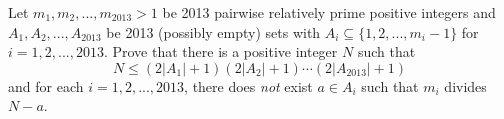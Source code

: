 Let $m_1,m_2,...,m_{2013} > 1$ be 2013 pairwise relatively prime positive integers and $A_1,A_2,...,A_{2013}$ be 2013 (possibly empty) sets with $A_i\subseteq \{1,2,...,m_i-1\}$ for $i=1,2,...,2013$.  Prove that there is a positive integer $N$ such that
\[ N \le \left( 2\left\lvert A_1 \right\rvert + 1 \right)\left( 2\left\lvert A_2 \right\rvert + 1 \right)\cdots\left( 2\left\lvert A_{2013} \right\rvert + 1 \right) \]
and for each $i = 1, 2, ..., 2013$, there does \textit{not} exist $a \in A_i$ such that $m_i$ divides $N-a$.

